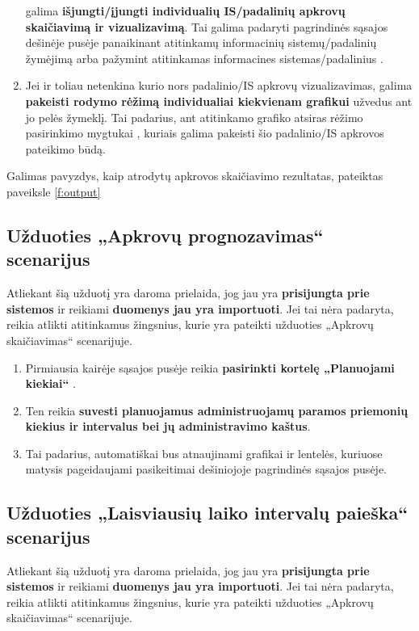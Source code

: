 \begin{enumerate}
    galima \textbf{išjungti/įjungti individualių IS/padalinių apkrovų
    skaičiavimą ir vizualizavimą}. Tai galima padaryti pagrindinės
    sąsajos dešinėje pusėje panaikinant atitinkamų informacinių
    sistemų/padalinių žymėjimą arba pažymint atitinkamas informacines
    sistemas/padalinius .
  \item Jei ir toliau netenkina kurio nors padalinio/IS apkrovų
    vizualizavimas, galima \textbf{pakeisti rodymo rėžimą
    individualiai kiekvienam grafikui} užvedus ant jo pelės žymeklį.
    Tai padarius, ant atitinkamo grafiko atsiras rėžimo pasirinkimo
    mygtukai , kuriais galima pakeisti šio
    padalinio/IS apkrovos pateikimo būdą.
\end{enumerate}

Galimas pavyzdys, kaip atrodytų apkrovos skaičiavimo rezultatas, pateiktas
paveiksle \ref{f:output}

\subsection{Užduoties „Apkrovų prognozavimas“ scenarijus}

Atliekant šią užduotį yra daroma prielaida, jog jau yra
\textbf{prisijungta prie sistemos} ir reikiami \textbf{duomenys jau yra
importuoti}. Jei tai nėra padaryta, reikia atlikti atitinkamus
žingsnius, kurie yra pateikti užduoties „Apkrovų skaičiavimas“
scenarijuje.

\begin{enumerate}
  \item Pirmiausia kairėje sąsajos pusėje reikia \textbf{pasirinkti
    kortelę „Planuojami kiekiai“} .
  \item Ten reikia \textbf{suvesti planuojamus administruojamų paramos
    priemonių kiekius ir intervalus bei jų administravimo kaštus}.
  \item Tai padarius, automatiškai bus atnaujinami grafikai ir
    lentelės, kuriuose matysis pageidaujami pasikeitimai dešiniojoje
    pagrindinės sąsajos  pusėje.
\end{enumerate}

\subsection{Užduoties „Laisviausių laiko intervalų paieška“ scenarijus}

Atliekant šią užduotį yra daroma prielaida, jog jau yra
\textbf{prisijungta prie sistemos} ir reikiami \textbf{duomenys jau
yra importuoti}. Jei tai nėra padaryta, reikia atlikti atitinkamus
žingsnius, kurie yra pateikti užduoties „Apkrovų skaičiavimas“
scenarijuje.

